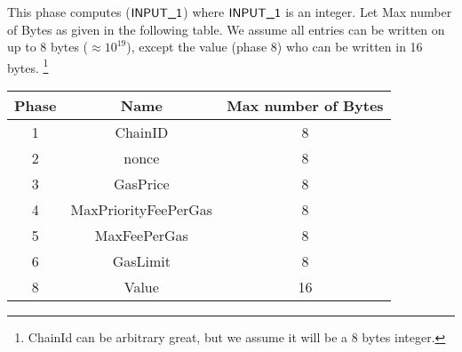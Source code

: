 \begin{center}
\end{center}

This phase computes \rlp($\textsf{INPUT\_1}$) where $\textsf{INPUT\_1}$ is an integer.
Let Max number of Bytes as given in the following table. We assume all entries can be written on up to 8 bytes ($\approx 10^{19}$), except the value (phase 8) who can be written in 16 bytes. \footnote{ChainId can be arbitrary great, but we assume it will be a 8 bytes integer.}

\begin{table}[h]
    \renewcommand{\arraystretch}{1.3}
    \centering
    \begin{tabular}{|c|c|c|} \hline
        Phase & Name                 & Max number of Bytes \\ \hline
        1     & ChainID              & 8                   \\ \hline
        2     & nonce                & 8                   \\ \hline
        3     & GasPrice             & 8                   \\ \hline
        4     & MaxPriorityFeePerGas & 8                   \\ \hline
        5     & MaxFeePerGas         & 8                   \\ \hline
        6     & GasLimit             & 8                   \\ \hline
        8     & Value                & 16                  \\ \hline
    \end{tabular}
\end{table}

